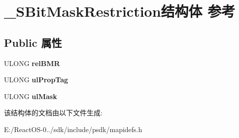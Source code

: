 \hypertarget{struct___s_bit_mask_restriction}{}\section{\+\_\+\+S\+Bit\+Mask\+Restriction结构体 参考}
\label{struct___s_bit_mask_restriction}
\subsection*{Public 属性}
\begin{DoxyCompactItemize}
\item 
\mbox{\label{struct___s_bit_mask_restriction_ad1ad2e6b7c4b806ca70740c83c9b7546}} 
U\+L\+O\+NG {\bfseries rel\+B\+MR}
\item 
\mbox{\label{struct___s_bit_mask_restriction_a4f1cb897b81f6f450d84d6e81f4a9675}} 
U\+L\+O\+NG {\bfseries ul\+Prop\+Tag}
\item 
\mbox{\label{struct___s_bit_mask_restriction_a91191437518ad5cb50fcc8312c41b39e}} 
U\+L\+O\+NG {\bfseries ul\+Mask}
\end{DoxyCompactItemize}


该结构体的文档由以下文件生成\+:\begin{DoxyCompactItemize}
\item 
E\+:/\+React\+O\+S-\/0../sdk/include/psdk/mapidefs.\+h\end{DoxyCompactItemize}
